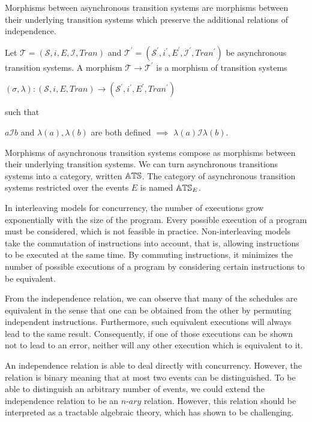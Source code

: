      Morphisms between asynchronous transition systems are morphisms between their underlying transition systems which preserve the additional relations of independence.
    
    \begin{definition}\label{def:morphisms-asynchronous-transition-system}
       Let $\mathcal{T} = (\mathcal{S},i,E,\mathcal{I},Tran)$ and $\mathcal{T}^{'} = (\mathcal{S}^{'},i^{'},E^{'},\mathcal{I}^{'},Tran^{'})$ be asynchronous transition systems. A morphism $\mathcal{T} \rightarrow \mathcal{T}^{'}$ is a morphism of transition systems
       
       \begin{center}
            $(\sigma, \lambda) : (\mathcal{S},i,E,Tran) \rightarrow (\mathcal{S}^{'},i^{'},E^{'},Tran^{'})$
       \end{center}
       
       such that
       
       \begin{center}
           $a\mathcal{I}b$ and $\lambda(a), \lambda(b)$ are both defined $\implies$ $\lambda(a)\mathcal{I}\lambda(b)$.
       \end{center}
    \end{definition}
    
    Morphisms of asynchronous transition systems compose as morphisms between their underlying transition systems. We can turn asynchronous transitions systems into a category, written $\mathbb{ATS}$. The category of asynchronous transition systems restricted over the events $E$ is named $\mathbb{ATS}_{E}$.
    
    In interleaving models for concurrency, the number of executions grow exponentially with the size of the program. Every possible execution of a program must be considered, which is not feasible in practice. Non-interleaving models take the commutation of instructions into account, that is, allowing instructions to be executed at the same time. By commuting instructions, it minimizes the number of possible executions of a program by considering certain instructions to be equivalent.
    
    From the independence relation, we can observe that many of the schedules are equivalent in the sense that one can be obtained from the other by permuting independent instructions. Furthermore, such equivalent executions will always lead to the same result. Consequently, if one of those executions can be shown not to lead to an error, neither will any other execution which is equivalent to it.
    
    An independence relation is able to deal directly with concurrency. However, the relation is binary meaning that at most two events can be distinguished. To be able to distinguish an arbitrary number of events, we could extend the independence relation to be an $n$-$ary$ relation. However, this relation should be interpreted as a tractable algebraic theory, which has shown to be challenging.